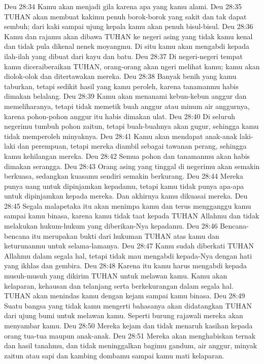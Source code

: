 Deu 28:34  Kamu akan menjadi gila karena apa yang kamu alami.
Deu 28:35  TUHAN akan membuat kakimu penuh borok-borok yang sakit dan tak dapat sembuh; dari kaki sampai ujung kepala kamu akan penuh bisul-bisul.
Deu 28:36  Kamu dan rajamu akan dibawa TUHAN ke negeri asing yang tidak kamu kenal dan tidak pula dikenal nenek moyangmu. Di situ kamu akan mengabdi kepada ilah-ilah yang dibuat dari kayu dan batu.
Deu 28:37  Di negeri-negeri tempat kamu diceraiberaikan TUHAN, orang-orang akan ngeri melihat kamu; kamu akan diolok-olok dan ditertawakan mereka.
Deu 28:38  Banyak benih yang kamu taburkan, tetapi sedikit hasil yang kamu peroleh, karena tanamanmu habis dimakan belalang.
Deu 28:39  Kamu akan menanami kebun-kebun anggur dan memeliharanya, tetapi tidak memetik buah anggur atau minum air anggurnya, karena pohon-pohon anggur itu habis dimakan ulat.
Deu 28:40  Di seluruh negerimu tumbuh pohon zaitun, tetapi buah-buahnya akan gugur, sehingga kamu tidak memperoleh minyaknya.
Deu 28:41  Kamu akan mendapat anak-anak laki-laki dan perempuan, tetapi mereka diambil sebagai tawanan perang, sehingga kamu kehilangan mereka.
Deu 28:42  Semua pohon dan tanamanmu akan habis dimakan serangga.
Deu 28:43  Orang asing yang tinggal di negerimu akan semakin berkuasa, sedangkan kuasamu sendiri semakin berkurang.
Deu 28:44  Mereka punya uang untuk dipinjamkan kepadamu, tetapi kamu tidak punya apa-apa untuk dipinjamkan kepada mereka. Dan akhirnya kamu dikuasai mereka.
Deu 28:45  Segala malapetaka itu akan menimpa kamu dan terus mengganggu kamu sampai kamu binasa, karena kamu tidak taat kepada TUHAN Allahmu dan tidak melakukan hukum-hukum yang diberikan-Nya kepadamu.
Deu 28:46  Bencana-bencana itu merupakan bukti dari hukuman TUHAN atas kamu dan keturunanmu untuk selama-lamanya.
Deu 28:47  Kamu sudah diberkati TUHAN Allahmu dalam segala hal, tetapi tidak mau mengabdi kepada-Nya dengan hati yang ikhlas dan gembira.
Deu 28:48  Karena itu kamu harus mengabdi kepada musuh-musuh yang dikirim TUHAN untuk melawan kamu. Kamu akan kelaparan, kehausan dan telanjang serta berkekurangan dalam segala hal. TUHAN akan menindas kamu dengan kejam sampai kamu binasa.
Deu 28:49  Suatu bangsa yang tidak kamu mengerti bahasanya akan didatangkan TUHAN dari ujung bumi untuk melawan kamu. Seperti burung rajawali mereka akan menyambar kamu.
Deu 28:50  Mereka kejam dan tidak menaruh kasihan kepada orang tua-tua maupun anak-anak.
Deu 28:51  Mereka akan menghabiskan ternak dan hasil tanahmu, dan tidak meninggalkan bagimu gandum, air anggur, minyak zaitun atau sapi dan kambing dombamu sampai kamu mati kelaparan.
